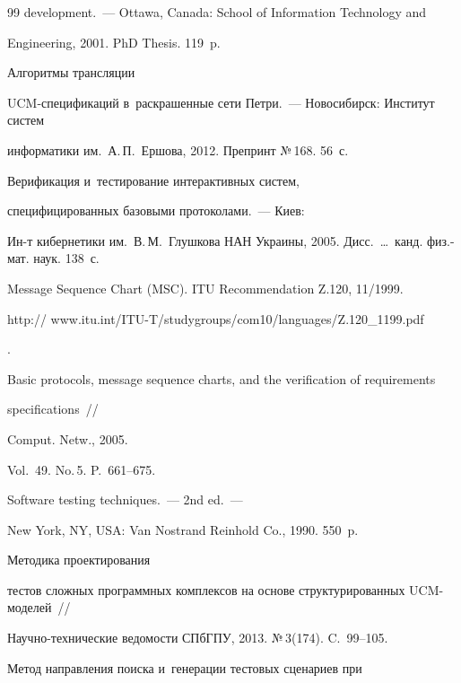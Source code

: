 {{\begin{thebibliography}{99}
  development.~--- Ottawa, Canada: School of Information Technology and

Engineering, 2001. PhD Thesis. 119~p.


   Алгоритмы трансляции

  UCM-спе\-ци\-фи\-ка\-ций в~раскрашенные сети Петри.~--- Новосибирск: Институт систем

информатики им.\ А.\,П.~Ершова, 2012. Препринт №\,168. 56~с.


   Верификация и~тестирование интерактивных систем,

специфицированных базовыми протоколами.~--- Киев:

Ин-т кибернетики им.\ В.\,М.~Глушкова НАН Украины, 2005. Дисс.\ \ldots \ канд. физ.-мат. наук. 138~с.


  Message Sequence Chart (MSC). ITU Recommendation Z.120, 11/1999. {\sf

http:// www.itu.int/ITU-T/studygroups/com10/languages/Z.120\_1199.pdf}.



Basic protocols, message sequence charts, and the verification of requirements

specifications~/\!\!/

Comput. Netw., 2005.

Vol.~49. No.\,5. P.~661--675.


   Software testing techniques.~--- 2nd ed.~---

  New York, NY, USA: Van Nostrand Reinhold Co., 1990. 550~p.


   Методика проектирования

тестов сложных программных комплексов на основе структурированных UCM-мо\-де\-лей~/\!\!/

На\-уч\-но-технические ведомости СПбГПУ, 2013. №\,3(174). C.~99--105.


   Метод направления поиска и~генерации тестовых сценариев при


\end{thebibliography}}}
